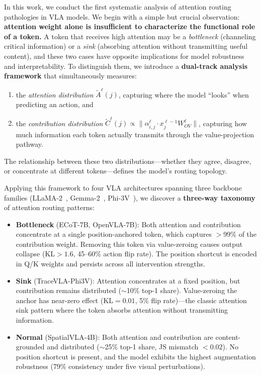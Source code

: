 In this work, we conduct the first systematic analysis of attention routing pathologies in VLA models.
We begin with a simple but crucial observation: \textbf{attention weight alone is insufficient to characterize the functional role of a token.}
A token that receives high attention may be a \emph{bottleneck} (channeling critical information) or a \emph{sink} (absorbing attention without transmitting useful content), and these two cases have opposite implications for model robustness and interpretability.
To distinguish them, we introduce a \textbf{dual-track analysis framework} that simultaneously measures:
\begin{enumerate}[leftmargin=*,nosep]
    \item the \emph{attention distribution} $\tilde{A}^\ell(j)$, capturing where the model ``looks'' when predicting an action, and
    \item the \emph{contribution distribution} $\tilde{C}^\ell(j) \propto \| \alpha_{i,j}^{\ell} \cdot x_j^{\ell-1} W_{OV}^{\ell} \|$, capturing how much information each token actually transmits through the value-projection pathway.
\end{enumerate}
The relationship between these two distributions---whether they agree, disagree, or concentrate at different tokens---defines the model's routing topology.

Applying this framework to four VLA architectures spanning three backbone families (LLaMA-2~\cite{touvron2023llama}, Gemma-2~\cite{team2024gemma}, Phi-3V~\cite{abdin2024phi3}), we discover a \textbf{three-way taxonomy} of attention routing patterns:

\begin{itemize}[leftmargin=*,nosep]
    \item \textbf{Bottleneck} (ECoT-7B, OpenVLA-7B): Both attention and contribution concentrate at a single position-anchored token, which captures $>$99\% of the contribution weight. Removing this token via value-zeroing causes output collapse ($\text{KL} > 1.6$, 45--60\% action flip rate). The position shortcut is encoded in Q/K weights and persists across all intervention strengths.

    \item \textbf{Sink} (TraceVLA-Phi3V): Attention concentrates at a fixed position, but contribution remains distributed ($\sim$10\% top-1 share). Value-zeroing the anchor has near-zero effect ($\text{KL} = 0.01$, 5\% flip rate)---the classic attention sink pattern where the token absorbs attention without transmitting information.

    \item \textbf{Normal} (SpatialVLA-4B): Both attention and contribution are content-grounded and distributed ($\sim$25\% top-1 share, JS mismatch $< 0.02$). No position shortcut is present, and the model exhibits the highest augmentation robustness (79\% consistency under five visual perturbations).
\end{itemize}

